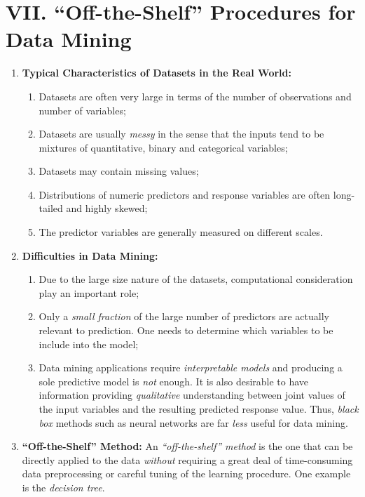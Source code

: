 \documentclass[12pt]{article}
\begin{document}
\section*{VII. ``Off-the-Shelf'' Procedures for Data Mining}

\begin{enumerate}[label=\textbf{\arabic*.}]

	\item \textbf{Typical Characteristics of Datasets in the Real World:} 
	\begin{enumerate}
		\item Datasets are often very large in terms of the number of observations and number of variables; 
		\item Datasets are usually \textit{messy} in the sense that the inputs tend to be mixtures of quantitative, binary and categorical variables; 
		\item Datasets may contain missing values; 
		\item Distributions of numeric predictors and response variables are often long-tailed and highly skewed; 
		\item The predictor variables are generally measured on different scales. 
	\end{enumerate}
	
	\item \textbf{Difficulties in Data Mining:} 
	\begin{enumerate}
		\item Due to the large size nature of the datasets, computational consideration play an important role; 
		\item Only a \emph{small fraction} of the large number of predictors are actually relevant to prediction. One needs to determine which variables to be include into the model; %
		\item Data mining applications require \emph{interpretable models} and producing a sole predictive model is \emph{not} enough. It is also desirable to have information providing \textit{qualitative} understanding between joint values of the input variables and the resulting predicted response value. Thus, \textit{black box} methods such as neural networks are far \textit{less} useful for data mining. 
	\end{enumerate}
	
	\item \textbf{``Off-the-Shelf'' Method:} An \emph{``off-the-shelf'' method} is the one that can be directly applied to the data \textit{without} requiring a great deal of time-consuming data preprocessing or careful tuning of the learning procedure. One example is the \textit{decision tree}. 
	

\end{enumerate}
\end{document}
